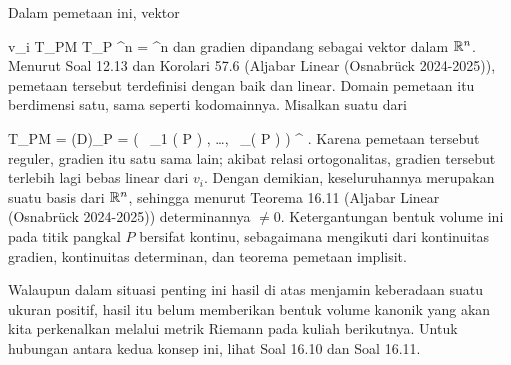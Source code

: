 {

Dalam pemetaan ini, vektor

\mavergleichskette
{\vergleichskette
{ v_i
}
{ \in }{ T_PM
}
{ \subseteq }{ T_P \R^n
}
{ =   }{ \R^n
}
{   }{
}
}
{}{}{}
dan gradien dipandang sebagai vektor dalam ${\mathbb R}^n$. Menurut
Soal 12.13
dan
Korolari 57.6 (Aljabar Linear (Osnabrück 2024-2025)),
pemetaan tersebut terdefinisi dengan baik dan linear. Domain pemetaan itu berdimensi satu, sama seperti kodomainnya. Misalkan
 suatu
dari

\mavergleichskettedisp
{\vergleichskette
{ T_PM
}
{ =} { \ker  \left(D\varphi\right)_{P}
}
{ =} { (
 \, \varphi_1  (  P ) , \ldots ,
 \, \varphi_\ell ( P ) ) ^{ { \perp  } }
}
{ } {
}
{ } {
}
}
{}{}{.}
Karena pemetaan tersebut reguler, gradien itu
satu sama lain; akibat relasi ortogonalitas, gradien tersebut terlebih lagi bebas linear dari $v_i$. Dengan demikian, keseluruhannya merupakan suatu basis dari ${\mathbb R}^n$, sehingga menurut
Teorema 16.11 (Aljabar Linear (Osnabrück 2024-2025))
determinannya $\neq 0$. Ketergantungan bentuk volume ini pada titik pangkal $P$ bersifat kontinu, sebagaimana mengikuti dari kontinuitas gradien, kontinuitas determinan, dan
teorema pemetaan implisit.

}

Walaupun dalam situasi penting ini hasil di atas menjamin keberadaan suatu ukuran positif, hasil itu belum memberikan bentuk volume kanonik yang akan kita perkenalkan melalui metrik Riemann pada kuliah berikutnya. Untuk hubungan antara kedua konsep ini, lihat
Soal 16.10
dan
Soal 16.11.



